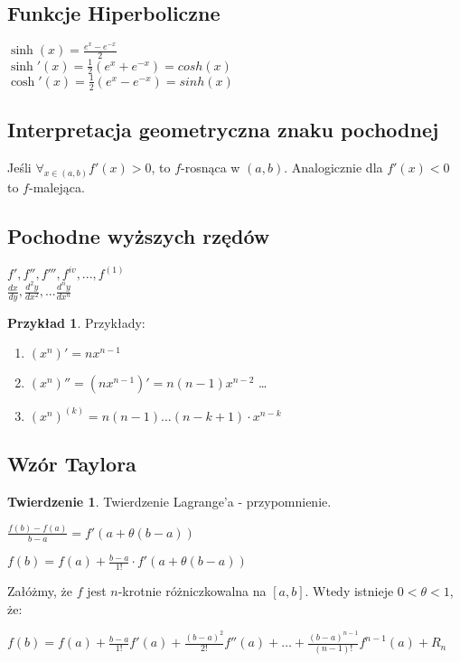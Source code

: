 \documentclass{article}
\theoremstyle{definition}
\theoremstyle{definition}
\newtheorem{tw}{Twierdzenie}[subsection]
\theoremstyle{definition}
\newtheorem{pk}{Przykład}[subsection]
\theoremstyle{definition}
\begin{document}
\subsection{Funkcje Hiperboliczne}

$\sinh(x)=\frac{e^x-e^{-x}}{2}$\\
$\sinh'(x)=\frac{1}{2}\left(e^x+e^{-x}\right)=cosh(x)$\\
$\cosh'(x)=\frac{1}{2}\left(e^x-e^{-x}\right)=sinh(x)$

\subsection{Interpretacja geometryczna znaku pochodnej}

Jeśli $\forall_{x\in(a,b)} f'(x)>0$, to $f$-rosnąca w $(a,b)$. Analogicznie dla $f'(x)<0$ to $f$-malejąca.

\subsection{Pochodne wyższych rzędów}

$f', f'', f''', f^{iv}, ..., f^{(1)}$\\
$\frac{dx}{dy}, \frac{d^2y}{dx^2}, ... \frac{d^ny}{dx^n}$\\

\begin{pk}
    Przykłady:\\
    \begin{enumerate}
        \item $(x^n)'=nx^{n-1}$
        \item $(x^n)''=(nx^{n-1})'=n(n-1)x^{n-2}$ \dots
        \item $(x^n)^(k) =n(n-1)...(n-k+1)\cdot x^{n-k}$
    \end{enumerate}
\end{pk}

\subsection{Wzór Taylora}

\begin{tw}
    Twierdzenie Lagrange'a - przypomnienie.\\
    \begin{center}
        $\frac{f(b)-f(a)}{b-a}=f'(a+\theta(b-a))$
    \end{center}
    \begin{center}
        $f(b)=f(a)+\frac{b-a}{1!}\cdot f'(a+\theta(b-a))$
    \end{center}
    Załóżmy, że $f$ jest $n$-krotnie różniczkowalna na $[a,b]$. Wtedy istnieje $0<\theta<1$, że:
    \begin{center}
        $f(b)=f(a)+\frac{b-a}{1!} f'(a) + \frac{(b-a)^2}{2!} f''(a) + \dots + \frac{(b-a)^{n-1}}{(n-1)!} f^{n-1} (a) + R_n$
    \end{center}
\end{tw}
\end{document}

